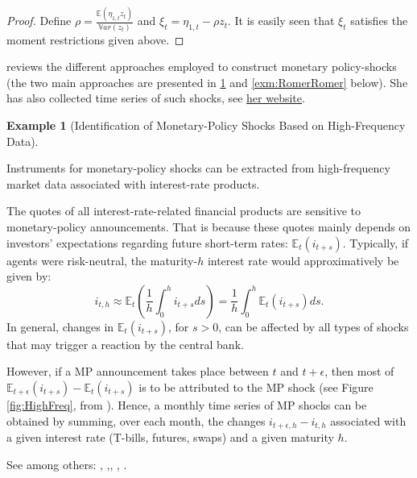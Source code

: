 \documentclass[
  12pt,
]{book}
\theoremstyle{definition}
\theoremstyle{definition}
\newtheorem{example}{Example}[chapter]
\theoremstyle{definition}
\theoremstyle{definition}
\theoremstyle{remark}
\begin{document}
\begin{proof}
Define \(\rho = \frac{\mathbb{E}(\eta_{1,t}z_t)}{\mathbb{V}ar(z_t)}\) and \(\xi_t = \eta_{1,t} - \rho z_t\). It is easily seen that \(\xi_t\) satisfies the moment restrictions given above.
\end{proof}

\citet{Ramey_2016_NBER} reviews the different approaches employed to construct monetary policy-shocks (the two main approaches are presented in \ref{exm:HighFreq} and \ref{exm:RomerRomer} below). She has also collected time series of such shocks, see \href{https://econweb.ucsd.edu/~vramey/research.html\#mon}{her website}.

\begin{example}[Identification of Monetary-Policy Shocks Based on High-Frequency Data]
\protect\hypertarget{exm:HighFreq}{}\label{exm:HighFreq}

Instruments for monetary-policy shocks can be extracted from high-frequency market data associated with interest-rate products.

The quotes of all interest-rate-related financial products are sensitive to monetary-policy announcements. That is because these quotes mainly depends on investors' expectations regarding future short-term rates: \(\mathbb{E}_t(i_{t+s})\). Typically, if agents were risk-neutral, the maturity-\(h\) interest rate would approximatively be given by:
\[
i_{t,h} \approx \mathbb{E}_t\left(\frac{1}{h}\int_{0}^{h} i_{t+s} ds\right) = \frac{1}{h}\int_{0}^{h} \mathbb{E}_t\left(i_{t+s}\right) ds.
\]
In general, changes in \(\mathbb{E}_t(i_{t+s})\), for \(s>0\), can be affected by all types of shocks that may trigger a reaction by the central bank.

However, if a MP announcement takes place between \(t\) and \(t+\epsilon\), then most of \(\mathbb{E}_{t+\epsilon}(i_{t+s})-\mathbb{E}_t(i_{t+s})\) is to be attributed to the MP shock (see Figure \ref{fig:HighFreq}, from \citet{Gurkaynak_et_al_2005}). Hence, a monthly time series of MP shocks can be obtained by summing, over each month, the changes \(i_{t+ \epsilon,h} - i_{t,h}\) associated with a given interest rate (T-bills, futures, swaps) and a given maturity \(h\).

See among others: \citet{KUTTNER2001523}, \citet{Cochrane_Piazzesi_2002},\citet{Gurkaynak_et_al_2005}, \citet{Piazzesi_Swanson_2008}, \citet{Gertler_Karadi_2015}.


\end{example}
\end{document}

